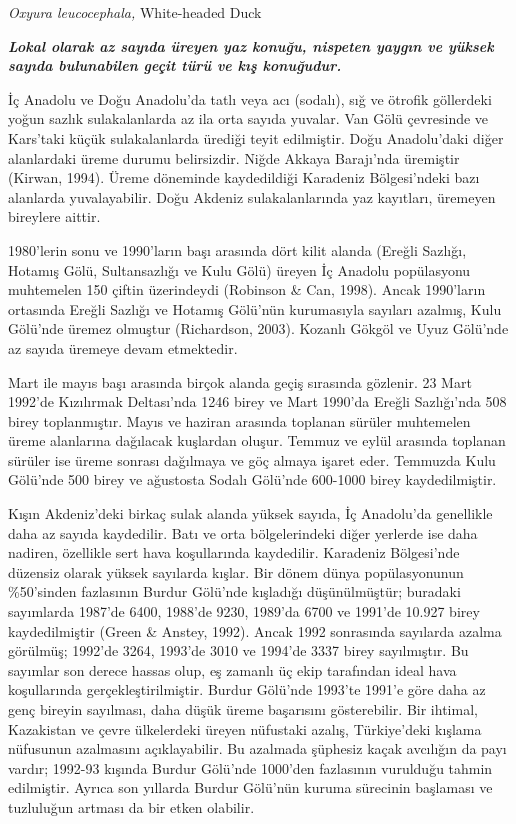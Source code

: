\documentclass[
  a4paper,
  DIV=11,
  numbers=noendperiod]{scrreprt}
\begin{document}
\emph{Oxyura leucocephala,} White-headed Duck

\textbf{\emph{Lokal olarak az sayıda üreyen yaz konuğu, nispeten yaygın
ve yüksek sayıda bulunabilen geçit türü ve kış konuğudur.}}

İç Anadolu ve Doğu Anadolu'da tatlı veya acı (sodalı), sığ ve ötrofik
göllerdeki yoğun sazlık sulakalanlarda az ila orta sayıda yuvalar. Van
Gölü çevresinde ve Kars'taki küçük sulakalanlarda ürediği teyit
edilmiştir. Doğu Anadolu'daki diğer alanlardaki üreme durumu
belirsizdir. Niğde Akkaya Barajı'nda üremiştir (Kirwan, 1994). Üreme
döneminde kaydedildiği Karadeniz Bölgesi'ndeki bazı alanlarda
yuvalayabilir. Doğu Akdeniz sulakalanlarında yaz kayıtları, üremeyen
bireylere aittir.

1980'lerin sonu ve 1990'ların başı arasında dört kilit alanda (Ereğli
Sazlığı, Hotamış Gölü, Sultansazlığı ve Kulu Gölü) üreyen İç Anadolu
popülasyonu muhtemelen 150 çiftin üzerindeydi (Robinson \& Can, 1998).
Ancak 1990'ların ortasında Ereğli Sazlığı ve Hotamış Gölü'nün
kurumasıyla sayıları azalmış, Kulu Gölü'nde üremez olmuştur (Richardson,
2003). Kozanlı Gökgöl ve Uyuz Gölü'nde az sayıda üremeye devam
etmektedir.

Mart ile mayıs başı arasında birçok alanda geçiş sırasında gözlenir. 23
Mart 1992'de Kızılırmak Deltası'nda 1246 birey ve Mart 1990'da Ereğli
Sazlığı'nda 508 birey toplanmıştır. Mayıs ve haziran arasında toplanan
sürüler muhtemelen üreme alanlarına dağılacak kuşlardan oluşur. Temmuz
ve eylül arasında toplanan sürüler ise üreme sonrası dağılmaya ve göç
almaya işaret eder. Temmuzda Kulu Gölü'nde 500 birey ve ağustosta Sodalı
Gölü'nde 600-1000 birey kaydedilmiştir.

Kışın Akdeniz'deki birkaç sulak alanda yüksek sayıda, İç Anadolu'da
genellikle daha az sayıda kaydedilir. Batı ve orta bölgelerindeki diğer
yerlerde ise daha nadiren, özellikle sert hava koşullarında kaydedilir.
Karadeniz Bölgesi'nde düzensiz olarak yüksek sayılarda kışlar. Bir dönem
dünya popülasyonunun \%50'sinden fazlasının Burdur Gölü'nde kışladığı
düşünülmüştür; buradaki sayımlarda 1987'de 6400, 1988'de 9230, 1989'da
6700 ve 1991'de 10.927 birey kaydedilmiştir (Green \& Anstey, 1992).
Ancak 1992 sonrasında sayılarda azalma görülmüş; 1992'de 3264, 1993'de
3010 ve 1994'de 3337 birey sayılmıştır. Bu sayımlar son derece hassas
olup, eş zamanlı üç ekip tarafından ideal hava koşullarında
gerçekleştirilmiştir. Burdur Gölü'nde 1993'te 1991'e göre daha az genç
bireyin sayılması, daha düşük üreme başarısını gösterebilir. Bir
ihtimal, Kazakistan ve çevre ülkelerdeki üreyen nüfustaki azalış,
Türkiye'deki kışlama nüfusunun azalmasını açıklayabilir. Bu azalmada
şüphesiz kaçak avcılığın da payı vardır; 1992-93 kışında Burdur Gölü'nde
1000'den fazlasının vurulduğu tahmin edilmiştir. Ayrıca son yıllarda
Burdur Gölü'nün kuruma sürecinin başlaması ve tuzluluğun artması da bir
etken olabilir.
\end{document}
